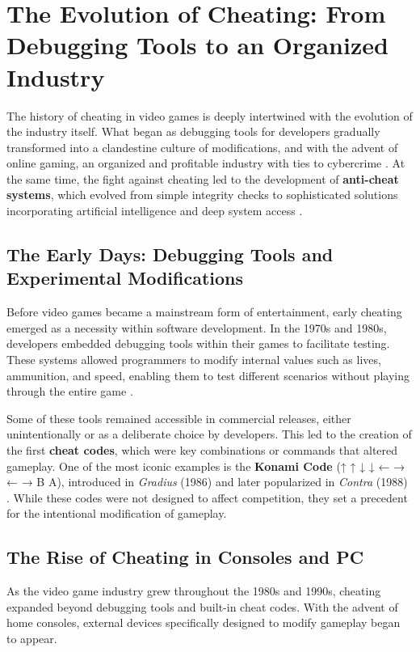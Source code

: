 \chapter{The Evolution of Cheating: From Debugging Tools to an Organized Industry}

The history of cheating in video games is deeply intertwined with the evolution of the industry itself. What began as debugging tools for developers gradually transformed into a clandestine culture of modifications, and with the advent of online gaming, an organized and profitable industry with ties to cybercrime \parencite{consalvo2007cheating}. At the same time, the fight against cheating led to the development of \textbf{anti-cheat systems}, which evolved from simple integrity checks to sophisticated solutions incorporating artificial intelligence and deep system access \parencite{yan2005cheats}.

\section{The Early Days: Debugging Tools and Experimental Modifications}

Before video games became a mainstream form of entertainment, early cheating emerged as a necessity within software development. In the 1970s and 1980s, developers embedded debugging tools within their games to facilitate testing. These systems allowed programmers to modify internal values such as lives, ammunition, and speed, enabling them to test different scenarios without playing through the entire game \parencite{smith2018konami}.

Some of these tools remained accessible in commercial releases, either unintentionally or as a deliberate choice by developers. This led to the creation of the first \textbf{cheat codes}, which were key combinations or commands that altered gameplay. One of the most iconic examples is the \textbf{Konami Code} (↑ ↑ ↓ ↓ ← → ← → B A), introduced in \textit{Gradius} (1986) and later popularized in \textit{Contra} (1988) \parencite{kent2001ultimate}. While these codes were not designed to affect competition, they set a precedent for the intentional modification of gameplay.

\section{The Rise of Cheating in Consoles and PC}

As the video game industry grew throughout the 1980s and 1990s, cheating expanded beyond debugging tools and built-in cheat codes. With the advent of home consoles, external devices specifically designed to modify gameplay began to appear.

